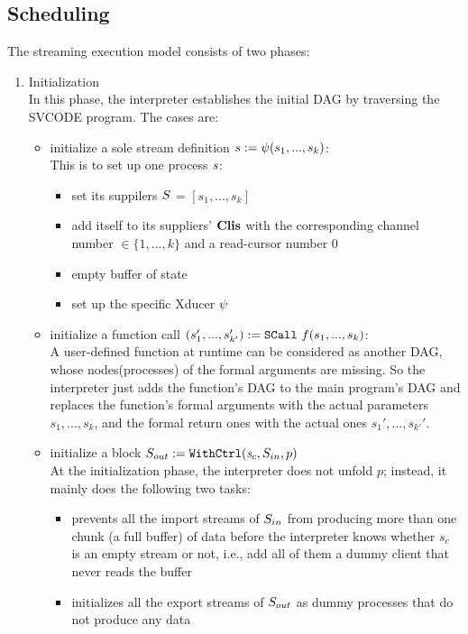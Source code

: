 \subsection{Scheduling}
The streaming execution model consists of two phases:
\begin{enumerate}[(1)]
\item Initialization \\
In this phase, the interpreter establishes the initial DAG by traversing the SVCODE program. The cases are:
\begin{itemize}
	\item initialize a sole stream definition $\sdef{s}{\lcall(s_1,...,s_k)}$: \\
	This is to set up one process $\s$:
	\begin{itemize}
		\item set its suppilers $\S$ = $[s_1,...,s_k]$
		\item add itself to its suppliers' $\clis$ with the corresponding channel number $\in \{1,...,k\}$ and a read-cursor number 0
		\item empty buffer of state \filling
		\item set up the specific Xducer $\lcall$
	\end{itemize}

	
	\item initialize a function call  $\scall{f}{s_1,...,s_k}{(s_1',...,s'_{k'})}$: \\
	A user-defined function at runtime can be considered as another DAG, whose nodes(processes) of the formal arguments are missing. 
	So the interpreter just adds the function's DAG to the main program's DAG 
	and replaces the function's formal arguments with the actual parameters $s_1,...,s_k$, and the formal return ones with the actual ones $s_1',...,s_{k'}'$.  

	
	\item initialize a \wc block $\withctrl{\s_c}{p}{\Sin}{\Sout}$ \\
	At the initialization phase, the interpreter does not unfold $p$; instead, it mainly does the following two tasks:	
	\begin{itemize}
		\item prevents all the import streams of $\Sin$ from producing more than one chunk (a full buffer) of data before the interpreter knows whether $s_c$ is an empty stream or not, i.e., add all of them a dummy client that never reads the buffer 
		\item initializes all the export streams of $\Sout$ as dummy processes that do not produce any data
	\end{itemize}


\end{itemize}
\end{enumerate}
